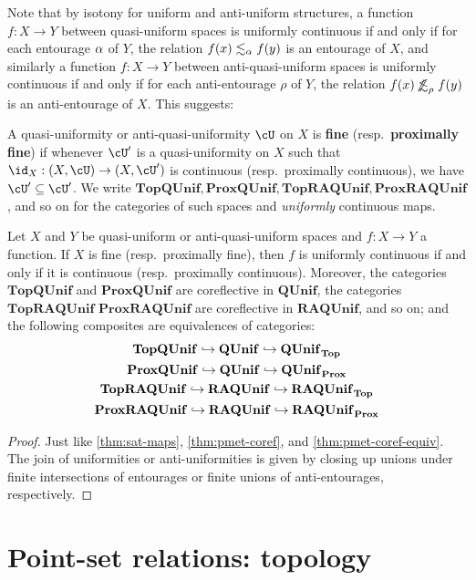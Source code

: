 \documentclass{article}
\def\oapt{\mathrel{\!\not\,\not\lesssim}}
\def\leapx{\lesssim}
\def\ent#1{\leapx_{#1}}
\def\aent#1{\oapt_{#1}}
\def\QUnif{\mathbf{QUnif}}
\def\RAQUnif{\mathbf{RAQUnif}}
\def\QUnifTop{\mathbf{QUnif}_{\mathbf{Top}}}
\def\QUnifProx{\mathbf{QUnif}_{\mathbf{Prox}}}
\def\TopQUnif{\mathbf{TopQUnif}}
\def\ProxQUnif{\mathbf{ProxQUnif}}
\def\RAQUnifTop{\mathbf{RAQUnif}_{\mathbf{Top}}}
\def\RAQUnifProx{\mathbf{RAQUnif}_{\mathbf{Prox}}}
\def\TopRAQUnif{\mathbf{TopRAQUnif}}
\def\ProxRAQUnif{\mathbf{ProxRAQUnif}}
\begin{document}
Note that by isotony for uniform and anti-uniform structures, a function $f:X\to Y$ between quasi-uniform spaces is uniformly continuous if and only if for each entourage $\alpha$ of $Y$, the relation $f(x)\ent\al f(y)$ is an entourage of $X$, and similarly a function $f:X\to Y$ between anti-quasi-uniform spaces is uniformly continuous if and only if for each anti-entourage $\rho$ of $Y$, the relation $f(x)\aent\rho f(y)$ is an anti-entourage of $X$.
This suggests:

\begin{defn}
  A quasi-uniformity or anti-quasi-uniformity $\cU$ on $X$ is \textbf{fine} (resp.\ \textbf{proximally fine}) if whenever $\cU'$ is a quasi-uniformity on $X$ such that $\id_X : (X,\cU) \to (X,\cU')$ is continuous (resp.\ proximally continuous), we have $\cU'\subseteq \cU'$.
  We write $\TopQUnif,\ProxQUnif,\TopRAQUnif,\ProxRAQUnif$, and so on for the categories of such spaces and \emph{uniformly} continuous maps.
\end{defn}

\begin{thm}\label{thm:unif-coref}
  Let $X$ and $Y$ be quasi-uniform or anti-quasi-uniform spaces and $f:X\to Y$ a function.
  If $X$ is fine (resp.\ proximally fine), then $f$ is uniformly continuous if and only if it is continuous (resp.\ proximally continuous).
  Moreover, the categories $\TopQUnif$ and $\ProxQUnif$ are coreflective in $\QUnif$, the categories $\TopRAQUnif$ $\ProxRAQUnif$ are coreflective in $\RAQUnif$, and so on; and the following composites are equivalences of categories:
  \begin{gather*}
    \TopQUnif \into \QUnif \into \QUnifTop\\
    \ProxQUnif \into \QUnif \into \QUnifProx\\
    \TopRAQUnif \into \RAQUnif \into \RAQUnifTop\\
    \ProxRAQUnif \into \RAQUnif \into \RAQUnifProx
  \end{gather*}
\end{thm}
\begin{proof}
  Just like \cref{thm:sat-maps}, \cref{thm:pmet-coref}, and \cref{thm:pmet-coref-equiv}.
  The join of uniformities or anti-uniformities is given by closing up unions under finite intersections of entourages or finite unions of anti-entourages, respectively.
\end{proof}


\section{Point-set relations: topology}
\label{sec:point-set}
\label{sec:topology}
\end{document}

